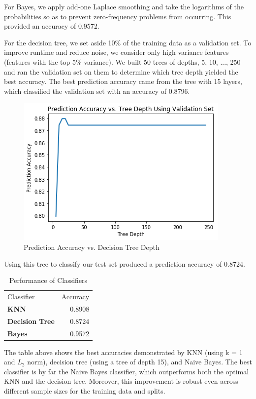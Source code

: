 \documentclass[twoside,11pt]{homework}
\begin{document}
	For Bayes, we apply add-one Laplace smoothing and take the logarithms of the probabilities so as to prevent zero-frequency problems from occurring. This provided an accuracy of 0.9572.
	
	For the decision tree, we set aside 10\% of the training data as a validation set. To improve runtime and reduce noise, we consider only high variance features (features with the top 5\% variance). We built 50 trees of depths, 5, 10, ..., 250 and ran the validation set on them to determine which tree depth yielded the best accuracy. The best prediction accuracy came from the tree with 15 layers, which classified the validation set with an accuracy of 0.8796.
	
	\begin{figure}[H]
		\centering
		\includegraphics[scale=.5]{q6_fig/dt_val.png}	
		\caption{Prediction Accuracy vs. Decision Tree Depth}
	\end{figure}
	
	Using this tree to classify our test set produced a prediction accuracy of 0.8724.
		\begin{table}[H]
	\centering
	\caption{Performance of Classifiers}
	\begin{tabular}{lr}
		Classifier   & Accuracy \\
		\textbf{KNN}   & 0.8908    \\
		\textbf{Decision Tree}   & 0.8724        \\
		\textbf{Bayes} & 0.9572
	\end{tabular}
	\end{table}
	
	The table above shows the best accuracies demonstrated by KNN (using k = 1 and $L_2$ norm), decision tree (using a tree of depth 15), and Naive Bayes. The best classifier is by far the Naive Bayes classifier, which outperforms both the optimal KNN and the decision tree. Moreover, this improvement is robust even across different sample sizes for the training data and splits.
	
\end{document}
